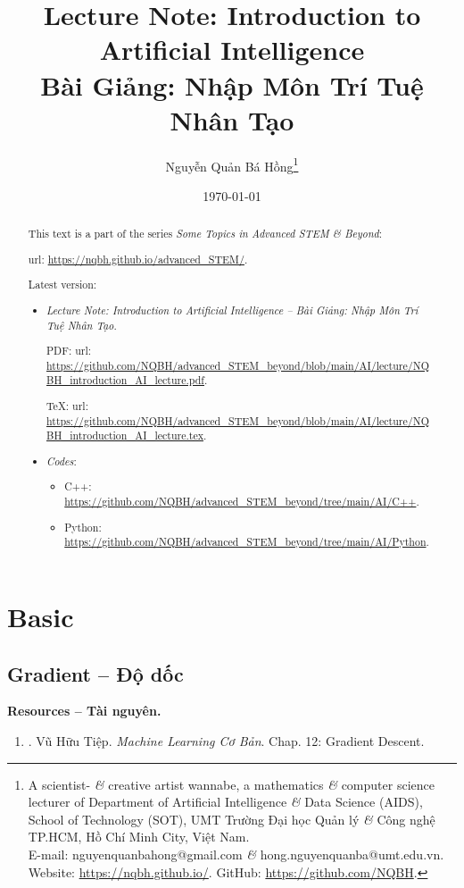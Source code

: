 \documentclass{article}
\title{Lecture Note: Introduction to Artificial Intelligence\\Bài Giảng: Nhập Môn Trí Tuệ Nhân Tạo}
\author{Nguyễn Quản Bá Hồng\footnote{A scientist- {\it\&} creative artist wannabe, a mathematics {\it\&} computer science lecturer of Department of Artificial Intelligence {\it\&} Data Science (AIDS), School of Technology (SOT), UMT Trường Đại học Quản lý {\it\&} Công nghệ TP.HCM, Hồ Chí Minh City, Việt Nam.\\E-mail: {\sf nguyenquanbahong@gmail.com} {\it\&} {\sf hong.nguyenquanba@umt.edu.vn}. Website: \url{https://nqbh.github.io/}. GitHub: \url{https://github.com/NQBH}.}}
\date{\today}
\begin{document}
\maketitle
\begin{abstract}
	This text is a part of the series {\it Some Topics in Advanced STEM \& Beyond}:
	
	{\sc url}: \url{https://nqbh.github.io/advanced_STEM/}.
	
	Latest version:
	\begin{itemize}
		\item {\it Lecture Note: Introduction to Artificial Intelligence -- Bài Giảng: Nhập Môn Trí Tuệ Nhân Tạo}.
		
		PDF: {\sc url}: \url{https://github.com/NQBH/advanced_STEM_beyond/blob/main/AI/lecture/NQBH_introduction_AI_lecture.pdf}.
		
		\TeX: {\sc url}: \url{https://github.com/NQBH/advanced_STEM_beyond/blob/main/AI/lecture/NQBH_introduction_AI_lecture.tex}.
		\item {\it Codes}:
		\begin{itemize}
			\item C++: \url{https://github.com/NQBH/advanced_STEM_beyond/tree/main/AI/C++}.
			\item Python: \url{https://github.com/NQBH/advanced_STEM_beyond/tree/main/AI/Python}.
		\end{itemize}
	\end{itemize}
\end{abstract}
\tableofcontents


\section{Basic}

\subsection{Gradient -- Độ dốc}
\textbf{\textsf{Resources -- Tài nguyên.}}
\begin{enumerate}
	\item \cite{Tiep_ML_co_ban}. {\sc Vũ Hữu Tiệp}. {\it Machine Learning Cơ Bản}. Chap. 12: Gradient Descent.
\end{enumerate}
\end{document}
